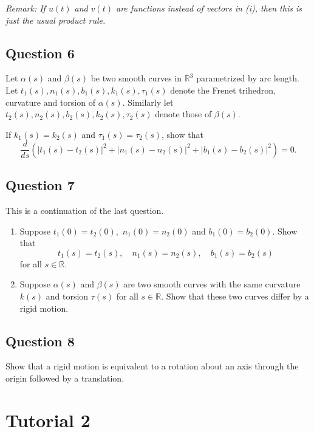 \documentclass[12pt, a4paper]{article}
\newcommand{\R}{\mathbb{R}}
\begin{document}
\vspace{1em}
\noindent\textit{Remark: If $u(t)$ and $v(t)$ are functions instead of vectors in (i), then this is just the usual product rule.}
\newpage

\subsection*{Question 6}
Let $\alpha(s)$ and $\beta(s)$ be two smooth curves in $\R^{3}$ parametrized by arc length. Let $t_{1}(s),n_{1}(s),b_{1}(s),k_{1}(s),\tau_{1}(s)$ denote the Frenet trihedron, curvature and torsion of $\alpha(s).$ Similarly let $t_{2}(s),n_{2}(s),b_{2}(s),k_{2}(s),\tau_{2}(s)$ denote those of $\beta(s)$.

If $k_{1}(s)=k_{2}(s)$ and $\tau_{1}(s)=\tau_{2}(s)$, show that
\[ \frac{d}{ds}(|t_{1}(s)-t_{2}(s)|^{2}+|n_{1}(s)-n_{2}(s)|^{2}+|b_{1}(s)-b_{2}(s)|^{2})=0. \]
\newpage

\subsection*{Question 7}
This is a continuation of the last question.
\begin{enumerate}[label=(\roman*)]
    \item Suppose $t_{1}(0)=t_{2}(0),$ $n_{1}(0)=n_{2}(0)$ and $b_{1}(0)=b_{2}(0).$ Show that
    \[ t_{1}(s)=t_{2}(s),\quad n_{1}(s)=n_{2}(s),\quad b_{1}(s)=b_{2}(s) \]
    for all $s\in\R.$
    \item Suppose $\alpha(s)$ and $\beta(s)$ are two smooth curves with the same curvature $k(s)$ and torsion $\tau(s)$ for all $s\in\R$. Show that these two curves differ by a rigid motion.
\end{enumerate}
\newpage

\subsection*{Question 8}
Show that a rigid motion is equivalent to a rotation about an axis through the origin followed by a translation.
\newpage

\section*{Tutorial 2}
\end{document}
